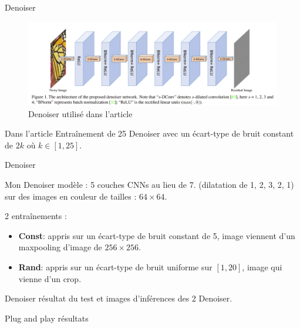 \documentclass[11pt]{beamer}
\begin{document}
\begin{frame}{Denoiser}
    \begin{figure}
        \centering
        \includegraphics[width=\textwidth]{../paper/model.png}
        \caption{Denoiser utilisé dans l'article}
    \end{figure}
    \begin{block}{Dans l'article}
        Entraînement de 25 Denoiser avec un écart-type de bruit constant de $2k$ où $k\in [1, 25]$.
    \end{block}
\end{frame}

\begin{frame}{Denoiser}
    \begin{block}{Mon Denoiser}
        modèle : 5 couches CNNs au lieu de 7. (dilatation de 1, 2, 3, 2, 1) sur des images en 
        couleur de tailles : $64 \times 64$.

        2 entraînements : 
        \begin{itemize}
            \item \textbf{Const}: appris sur un écart-type de bruit constant de 5,
            image viennent d'un maxpooling d'image de $256 \times 256$. \\

            \item \textbf{Rand}: appris sur un écart-type de bruit uniforme sur $[1, 20]$, 
            image qui vienne d'un crop.
        \end{itemize}
    \end{block}
\end{frame}

\begin{frame}{Denoiser}
    résultat du test et images d'inférences des 2 Denoiser.
\end{frame}

\begin{frame}{Plug and play}
    résultats
\end{frame}
\end{document}
